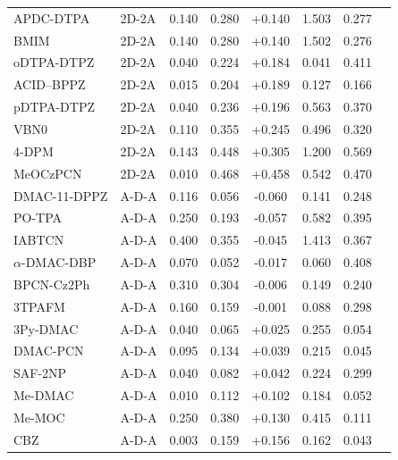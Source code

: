 \begin{longtable}{llcccccc}
APDC-DTPA & 2D-2A & 0.140 & 0.280 & +0.140 & 1.503 & 0.277 & \cite{doi101039D2TC01727J} \\
BMIM & 2D-2A & 0.140 & 0.280 & +0.140 & 1.502 & 0.276 & \cite{doi101039D2TC01727J} \\
oDTPA-DTPZ & 2D-2A & 0.040 & 0.224 & +0.184 & 0.041 & 0.411 & \cite{doi101016jcej2022141061} \\
ACID--BPPZ & 2D-2A & 0.015 & 0.204 & +0.189 & 0.127 & 0.166 & \cite{doi101039C8TC06081A} \\
pDTPA-DTPZ & 2D-2A & 0.040 & 0.236 & +0.196 & 0.563 & 0.370 & \cite{doi101016jcej2022141061} \\
VBN0 & 2D-2A & 0.110 & 0.355 & +0.245 & 0.496 & 0.320 & \cite{doi101016jorgel2021106417} \\
4-DPM & 2D-2A & 0.143 & 0.448 & +0.305 & 1.200 & 0.569 & \cite{doi101016jdyepig201701010} \\
MeOCzPCN & 2D-2A & 0.010 & 0.468 & +0.458 & 0.542 & 0.470 & \cite{doi101016jjare202101014} \\
DMAC-11-DPPZ & A-D-A & 0.116 & 0.056 & -0.060 & 0.141 & 0.248 & \cite{doi101016jdyepig2021109580} \\
PO-TPA & A-D-A & 0.250 & 0.193 & -0.057 & 0.582 & 0.395 & \cite{doi101016jcej2022141074} \\
IABTCN & A-D-A & 0.400 & 0.355 & -0.045 & 1.413 & 0.367 & \cite{doi101016jsynthmet2019116198} \\
$\alpha$-DMAC-DBP & A-D-A & 0.070 & 0.052 & -0.017 & 0.060 & 0.408 & \cite{doi101016jdyepig2021109580} \\
BPCN-Cz2Ph & A-D-A & 0.310 & 0.304 & -0.006 & 0.149 & 0.240 & \cite{doi101016jorgel2020105660} \\
3TPAFM & A-D-A & 0.160 & 0.159 & -0.001 & 0.088 & 0.298 & \cite{doi101016jorgel2022106645} \\
3Py-DMAC & A-D-A & 0.040 & 0.065 & +0.025 & 0.255 & 0.054 & \cite{doi101016jcej2020126107} \\
DMAC-PCN & A-D-A & 0.095 & 0.134 & +0.039 & 0.215 & 0.045 & \cite{doi101016jcej2020125276} \\
SAF-2NP & A-D-A & 0.040 & 0.082 & +0.042 & 0.224 & 0.299 & \cite{doi101039D2MH00639A} \\
Me-DMAC & A-D-A & 0.010 & 0.112 & +0.102 & 0.184 & 0.052 & \cite{doi101039C9TC05340A} \\
Me-MOC & A-D-A & 0.250 & 0.380 & +0.130 & 0.415 & 0.111 & \cite{doi101016jdyepig2020108521} \\
CBZ & A-D-A & 0.003 & 0.159 & +0.156 & 0.162 & 0.043 & \cite{doi101039C9DT04672K} \\

\end{longtable}
